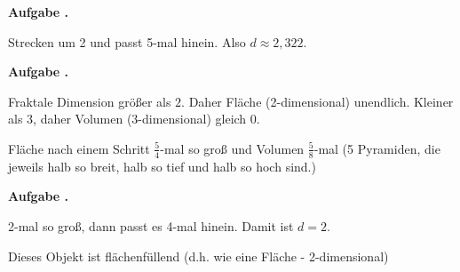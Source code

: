 \documentclass[a4paper,ngerman,12pt]{scrartcl}
\theoremstyle{definition}
\theoremstyle{plain}
\theoremstyle{remark}
\newlength{\aufgabenskip}
\newcounter{aufgabennummer}
\newenvironment{aufgabe}[1]{
  \addtocounter{aufgabennummer}{1}
  \textbf{Aufgabe \theaufgabennummer.} \emph{#1} \par
}{\vspace{\aufgabenskip}}
\begin{document}
\begin{aufgabe}{}
	Strecken um 2 und passt 5-mal hinein. Also $d \approx 2,322$.
\end{aufgabe}
	
\begin{aufgabe}{}
	Fraktale Dimension größer als $2$. Daher Fläche (2-dimensional) unendlich. Kleiner als $3$, daher Volumen (3-dimensional) gleich 0.
	
	Fläche nach einem Schritt $\frac{5}{4}$-mal so groß und Volumen $\frac{5}{8}$-mal (5 Pyramiden, die jeweils halb so breit, halb so tief und halb so hoch sind.)
\end{aufgabe}

\begin{aufgabe}{}
	2-mal so groß, dann passt es 4-mal hinein. Damit ist $d = 2$. 
	
	Dieses Objekt ist flächenfüllend (d.h. wie eine Fläche - 2-dimensional)
\end{aufgabe}
\end{document}
